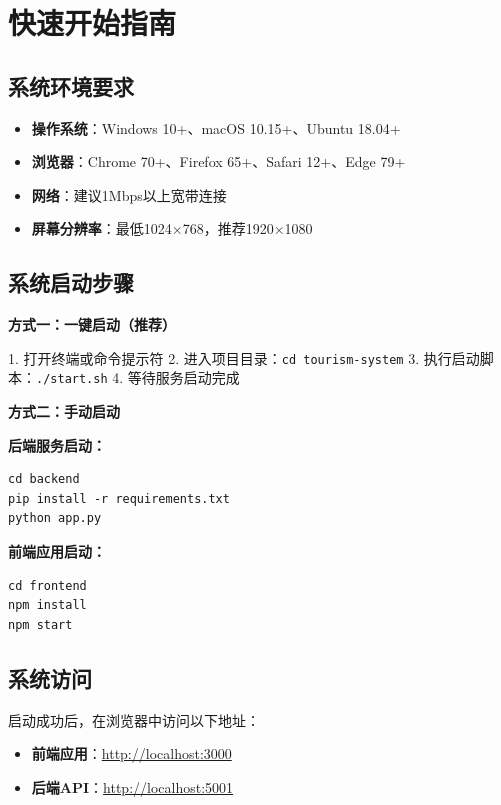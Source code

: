 \documentclass[12pt, a4paper]{article}
\begin{document}
\section{快速开始指南}

\subsection{系统环境要求}

\begin{warningbox}[title={环境配置要求}]
\begin{itemize}[nosep]
    \item \textbf{操作系统}：Windows 10+、macOS 10.15+、Ubuntu 18.04+
    \item \textbf{浏览器}：Chrome 70+、Firefox 65+、Safari 12+、Edge 79+
    \item \textbf{网络}：建议1Mbps以上宽带连接
    \item \textbf{屏幕分辨率}：最低1024×768，推荐1920×1080
\end{itemize}
\end{warningbox}

\subsection{系统启动步骤}

\begin{stepbox}[title={启动步骤}]
\textbf{方式一：一键启动（推荐）}

1. 打开终端或命令提示符
2. 进入项目目录：\texttt{cd tourism-system}
3. 执行启动脚本：\texttt{./start.sh}
4. 等待服务启动完成

\textbf{方式二：手动启动}

\textbf{后端服务启动：}
\begin{verbatim}
cd backend
pip install -r requirements.txt
python app.py
\end{verbatim}

\textbf{前端应用启动：}
\begin{verbatim}
cd frontend
npm install
npm start
\end{verbatim}
\end{stepbox}

\subsection{系统访问}

启动成功后，在浏览器中访问以下地址：
\begin{itemize}
    \item \textbf{前端应用}：\url{http://localhost:3000}
    \item \textbf{后端API}：\url{http://localhost:5001}
\end{itemize}
\end{document}
